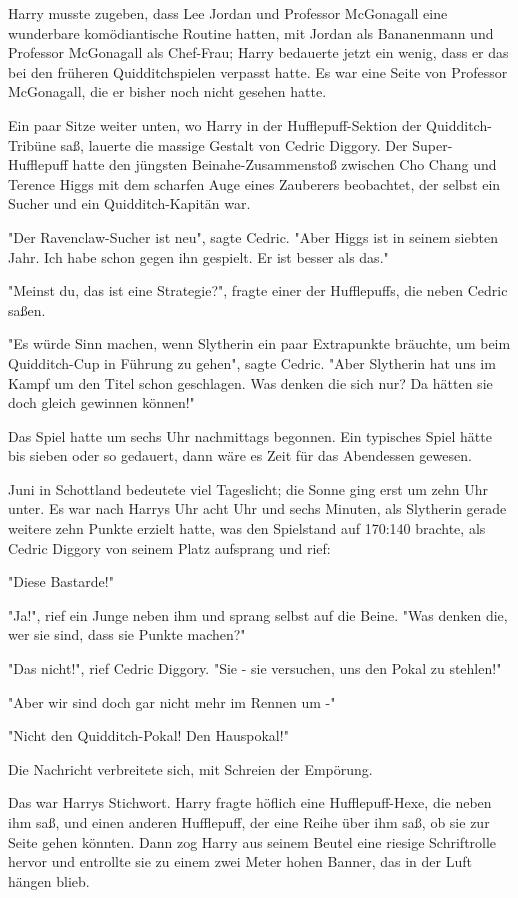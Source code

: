 {Harry musste zugeben, dass Lee Jordan und Professor McGonagall eine wunderbare komödiantische Routine hatten, mit Jordan als Bananenmann und Professor McGonagall als Chef-Frau; Harry bedauerte jetzt ein wenig, dass er das bei den früheren Quidditchspielen verpasst hatte. Es war eine Seite von Professor McGonagall, die er bisher noch nicht gesehen hatte.

Ein paar Sitze weiter unten, wo Harry in der Hufflepuff-Sektion der Quidditch-Tribüne saß, lauerte die massige Gestalt von Cedric Diggory. Der Super-Hufflepuff hatte den jüngsten Beinahe-Zusammenstoß zwischen Cho Chang und Terence Higgs mit dem scharfen Auge eines Zauberers beobachtet, der selbst ein Sucher und ein Quidditch-Kapitän war.

"Der Ravenclaw-Sucher ist neu", sagte Cedric. "Aber Higgs ist in seinem siebten Jahr. Ich habe schon gegen ihn gespielt. Er ist besser als das."

"Meinst du, das ist eine Strategie?", fragte einer der Hufflepuffs, die neben Cedric saßen.

"Es würde Sinn machen, wenn Slytherin ein paar Extrapunkte bräuchte, um beim Quidditch-Cup in Führung zu gehen", sagte Cedric. "Aber Slytherin hat uns im Kampf um den Titel schon geschlagen. Was denken die sich nur? Da hätten sie doch gleich gewinnen können!"

Das Spiel hatte um sechs Uhr nachmittags begonnen. Ein typisches Spiel hätte bis sieben oder so gedauert, dann wäre es Zeit für das Abendessen gewesen.

Juni in Schottland bedeutete viel Tageslicht; die Sonne ging erst um zehn Uhr unter. Es war nach Harrys Uhr acht Uhr und sechs Minuten, als Slytherin gerade weitere zehn Punkte erzielt hatte, was den Spielstand auf 170:140 brachte, als Cedric Diggory von seinem Platz aufsprang und rief:

"Diese Bastarde!"

"Ja!", rief ein Junge neben ihm und sprang selbst auf die Beine. "Was denken die, wer sie sind, dass sie Punkte machen?"

"Das nicht!", rief Cedric Diggory. "Sie - sie versuchen, uns den Pokal zu stehlen!"

"Aber wir sind doch gar nicht mehr im Rennen um -"

"Nicht den Quidditch-Pokal! Den Hauspokal!"

Die Nachricht verbreitete sich, mit Schreien der Empörung.

Das war Harrys Stichwort. Harry fragte höflich eine Hufflepuff-Hexe, die neben ihm saß, und einen anderen Hufflepuff, der eine Reihe über ihm saß, ob sie zur Seite gehen könnten. Dann zog Harry aus seinem Beutel eine riesige Schriftrolle hervor und entrollte sie zu einem zwei Meter hohen Banner, das in der Luft hängen blieb.

}
